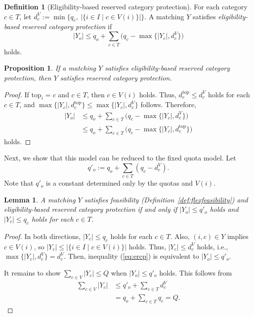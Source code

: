 \documentclass[a4paper,twoside]{article}
\newtheorem{lemma}{Lemma}
\newtheorem{proposition}{Proposition}
\theoremstyle{definition}
\newtheorem{definition}{Definition}
\newcommand{\dtop}{d^{\mathrm{top}}}
\newcommand{\dV}{d^{V}}
\newcommand{\topc}{\mathrm{top}}
\begin{document}
\begin{definition}[Eligibility-based reserved category protection]
\label{def:ercp}
For each category $c\in T$, let
$\dV_c:=\min\{q_c,\ |\{i\in I\mid c\in V(i)\}|\}$.
A matching $Y$ satisfies \emph{eligibility-based reserved category protection} if
\begin{equation}
\label{eq:ercp}
|Y_o|\le q_o+\sum_{c\in T}\bigl(q_c-\max\{|Y_c|,\dV_c\}\bigr)
\end{equation}
holds.
\end{definition}

\begin{proposition}
\label{prop:implies}
If a matching $Y$ satisfies eligibility-based reserved category protection, then $Y$
satisfies reserved category protection.
\end{proposition}
\begin{proof}
If $\topc_i=c$ and $c\in T$, then $c\in V(i)$ holds.
Thus, $\dtop_c\le\dV_c$ holds for each $c\in T$, and
$\max\{|Y_c|,\dtop_c\}\le\max\{|Y_c|,\dV_c\}$ follows. Therefore,
\begin{align}
|Y_o| &\le q_o+\sum_{c\in T}\bigl(q_c-\max\{|Y_c|,\dV_c\}\bigr)\nonumber\\
      &\le q_o+\sum_{c\in T}\bigl(q_c-\max\{|Y_c|,\dtop_c\}\bigr)
\end{align}
holds.
\end{proof}

Next, we show that this model can be reduced to the fixed quota model.
Let
\begin{equation}
\label{eq:qprime}
q'_o:=q_o+\sum_{c\in T}(q_c-\dV_c).
\end{equation}
Note that $q'_o$ is a constant determined only by the quotas and $V(i)$.

\begin{lemma}
\label{lem:reduction}
A matching $Y$ satisfies feasibility (Definition~\ref{def:flexfeasibility}) and
eligibility-based reserved category protection if and only if $|Y_o|\le q'_o$ holds and
$|Y_c|\le q_c$ holds for each $c\in T$.
\end{lemma}
\begin{proof}
In both directions, $|Y_c|\le q_c$ holds for each $c\in T$.
Also, $(i,c)\in Y$ implies $c\in V(i)$, so $|Y_c|\le|\{i\in I\mid c\in V(i)\}|$ holds.
Thus, $|Y_c|\le\dV_c$ holds, i.e., $\max\{|Y_c|,\dV_c\}=\dV_c$.
Then, inequality (\ref{eq:ercp}) is equivalent to $|Y_o|\le q'_o$.

It remains to show $\sum_{c\in V}|Y_c|\le Q$ when $|Y_o|\le q'_o$ holds.
This follows from
\begin{align}
\sum_{c\in V}|Y_c| &\le q'_o+\sum_{c\in T}\dV_c\nonumber\\
                   &= q_o+\sum_{c\in T}q_c=Q.
\end{align}
\end{proof}
\end{document}
